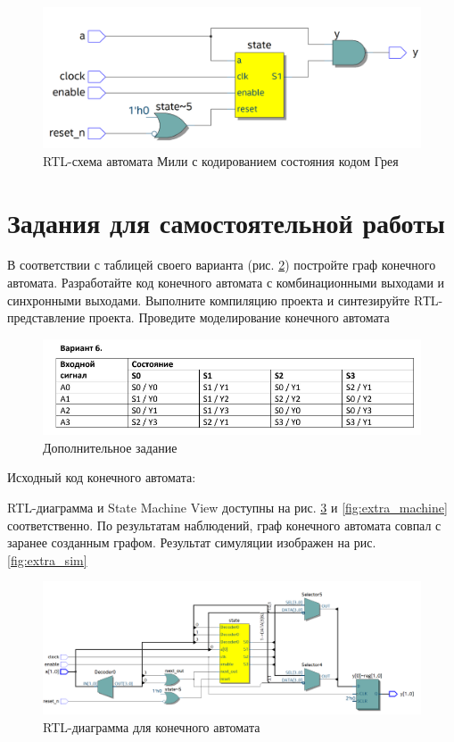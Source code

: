 \documentclass[a4paper,14pt]{article}
\begin{document}
	\begin{figure}[H]
		\centering
		\includegraphics[width=\linewidth]{images/z2_gray_rtl}
		\caption{RTL-схема автомата Мили с кодированием состояния кодом Грея}
		\label{fig:z2_gray_rtl}
	\end{figure}

	\section{Задания для самостоятельной работы}

	В соответствии с таблицей своего варианта (рис. \ref{fig:extra_table}) постройте граф конечного автомата.
	Разработайте код конечного автомата с комбинационными выходами и синхронными
	выходами. Выполните компиляцию проекта и синтезируйте RТL-представление проекта.
	Проведите моделирование конечного автомата
	
	\begin{figure}[H]
		\centering
		\includegraphics[width=\linewidth]{images/extra_table}
		\caption{Дополнительное задание}
		\label{fig:extra_table}
	\end{figure}

	Исходный код конечного автомата:
	
	RTL-диаграмма и State Machine View доступны на рис. \ref{fig:extra_rtl} и \ref{fig:extra_machine} соответственно.
	По результатам наблюдений, граф конечного автомата совпал с заранее созданным графом.
	Результат симуляции изображен на рис. \ref{fig:extra_sim}
	
	\begin{figure}[H]
		\centering
		\includegraphics[width=\linewidth]{images/extra_rtl}
		\caption{RTL-диаграмма для конечного автомата}
		\label{fig:extra_rtl}
	\end{figure}
\end{document}
